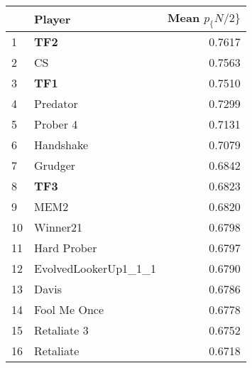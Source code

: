 \begin{tabular}{llr}
\toprule
{} &                Player &  Mean $p_\{N/2\}$ \\
\midrule
1  &                   \textbf{TF2} &          0.7617 \\
2  &                    CS &          0.7563 \\
3  &                   \textbf{TF1} &          0.7510 \\
4  &              Predator &          0.7299 \\
5  &              Prober 4 &          0.7131 \\
6  &             Handshake &          0.7079 \\
7  &               Grudger &          0.6842 \\
8  &                   \textbf{TF3} &          0.6823 \\
9  &                  MEM2 &          0.6820 \\
10 &              Winner21 &          0.6798 \\
11 &           Hard Prober &          0.6797 \\
12 &  EvolvedLookerUp1\_1\_1 &          0.6790 \\
13 &                 Davis &          0.6786 \\
14 &          Fool Me Once &          0.6778 \\
15 &           Retaliate 3 &          0.6752 \\
16 &             Retaliate &          0.6718 \\
\bottomrule
\end{tabular}
